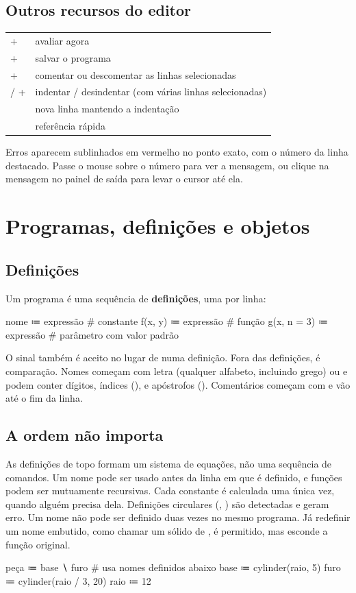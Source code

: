 \subsection{Outros recursos do editor}
\begin{longtable}{@{}L{0.3}L{0.70}@{}}
\toprule
{}+ & avaliar agora \\
+ & salvar o programa \\
+\kbd{/} & comentar ou descomentar as linhas selecionadas \\
 / + & indentar / desindentar (com várias linhas selecionadas) \\
 & nova linha mantendo a indentação \\
 & referência rápida \\
\bottomrule
\end{longtable}
Erros aparecem sublinhados em vermelho no ponto exato, com o número da linha destacado. Passe o mouse sobre o número
para ver a mensagem, ou clique na mensagem no painel de saída para levar o cursor até ela.

\section{Programas, definições e objetos}\label{sec:programas}

\subsection{Definições}
Um programa é uma sequência de \textbf{definições}, uma por linha:
\begin{csg}
nome ≔ expressão                        # constante
f(x, y) ≔ expressão                     # função
g(x, n = 3) ≔ expressão                 # parâmetro com valor padrão
\end{csg}
O sinal \code{=} também é aceito no lugar de  numa definição. Fora das definições, \code{=} é comparação.
Nomes começam com letra (qualquer alfabeto, incluindo grego) ou \code{_} e podem conter dígitos, índices
(), \code{_} e apóstrofos (). Comentários começam com \code{#} e vão até o fim da linha.

\subsection{A ordem não importa}
As definições de topo formam um sistema de equações, não uma sequência de comandos. Um nome pode ser usado antes
da linha em que é definido, e funções podem ser mutuamente recursivas. Cada constante é calculada uma única vez, quando
alguém precisa dela. Definições circulares (, ) são detectadas e
geram erro. Um nome não pode ser definido duas vezes no mesmo programa. Já redefinir um nome embutido, como chamar um sólido
de , é permitido, mas esconde a função original.
\begin{csg}[run]
peça ≔ base ∖ furo          # usa nomes definidos abaixo
base ≔ cylinder(raio, 5)
furo ≔ cylinder(raio / 3, 20)
raio ≔ 12
\end{csg}

